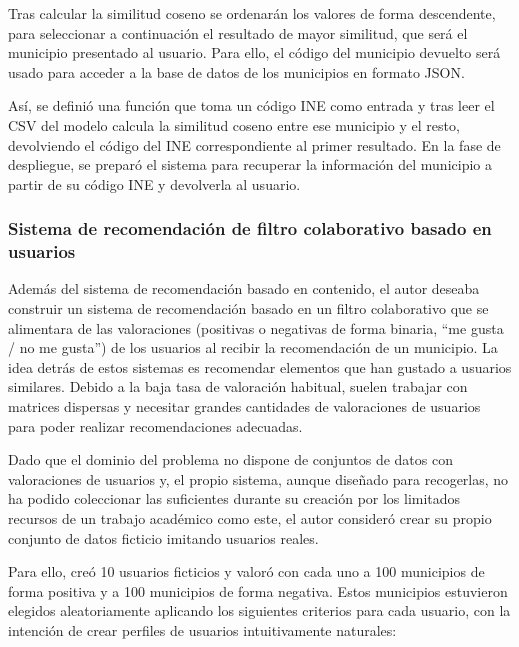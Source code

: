 Tras calcular la similitud coseno se ordenarán los valores de forma descendente, para seleccionar a continuación el resultado de mayor similitud, que será el municipio presentado al usuario. Para ello, el código del municipio devuelto será usado para acceder a la base de datos de los municipios en formato JSON.


Así, se definió una función que toma un código INE como entrada y tras leer el CSV del modelo calcula la similitud coseno entre ese municipio y el resto, devolviendo el código del INE correspondiente al primer resultado. En la fase de despliegue, se preparó el sistema para recuperar la información del municipio a partir de su código INE y devolverla al usuario.

\subsubsection{Sistema de recomendación de filtro colaborativo basado en usuarios}

Además del sistema de recomendación basado en contenido, el autor deseaba construir un sistema de recomendación basado en un filtro colaborativo que se alimentara de las valoraciones (positivas o negativas de forma binaria, ``me gusta / no me gusta'') de los usuarios al recibir la recomendación de un municipio. La idea detrás de estos sistemas es recomendar elementos que han gustado a usuarios similares. Debido a la baja tasa de valoración habitual, suelen trabajar con matrices dispersas y necesitar grandes cantidades de valoraciones de usuarios para poder realizar recomendaciones adecuadas.

Dado que el dominio del problema no dispone de conjuntos de datos con valoraciones de usuarios y, el propio sistema, aunque diseñado para recogerlas, no ha podido coleccionar las suficientes durante su creación por los limitados recursos de un trabajo académico como este, el autor consideró crear su propio conjunto de datos ficticio imitando usuarios reales.

Para ello, creó 10 usuarios ficticios y valoró con cada uno a 100 municipios de forma positiva y a 100 municipios de forma negativa. Estos municipios estuvieron elegidos aleatoriamente aplicando los siguientes criterios para cada usuario, con la intención de crear perfiles de usuarios intuitivamente naturales:

